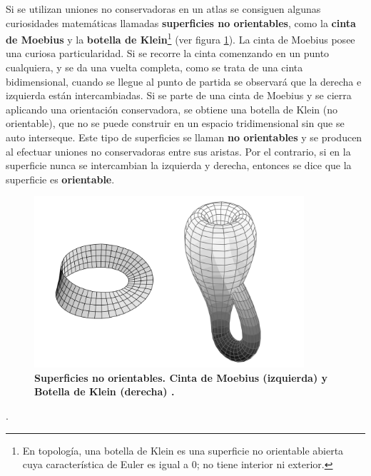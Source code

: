 \vspace{5mm}
Si se utilizan uniones no conservadoras en un atlas se consiguen algunas curiosidades matemáticas llamadas \textbf{superficies no orientables}, como la \textbf{cinta de Moebius} y la \textbf{botella de Klein}\footnote{En topología, una botella de Klein es una superficie no orientable abierta cuya característica de Euler es igual a $0$; no tiene interior ni exterior.} (ver figura \ref{fig:atlas2}). La cinta de Moebius posee una curiosa particularidad. Si se recorre la cinta comenzando en un punto cualquiera, y se da una vuelta completa, como se trata de una cinta bidimensional, cuando se llegue al punto de partida se observará que la derecha e izquierda están intercambiadas. 
Si se parte de una cinta de Moebius y se cierra aplicando una orientación conservadora, se obtiene una botella de Klein (no orientable), que no se puede construir en un espacio tridimensional sin que se auto interseque.
Este tipo de superficies se llaman \textbf{no orientables} y se producen al efectuar uniones no conservadoras entre sus aristas. Por el contrario, si en la superficie nunca se intercambian la izquierda y derecha, entonces se dice que la superficie es \textbf{orientable}.

\begin{figure}[h]
\includegraphics[width=10cm]{Img/GEO/geo-mobius.jpg}
\centering
\caption{\textbf{\footnotesize{Superficies no orientables. Cinta de Moebius (izquierda) y Botella de Klein (derecha) \citep{Ramos2011}.}}}
\label{fig:atlas2}
\end{figure}

 \citep{Ramos2011}.\newline



